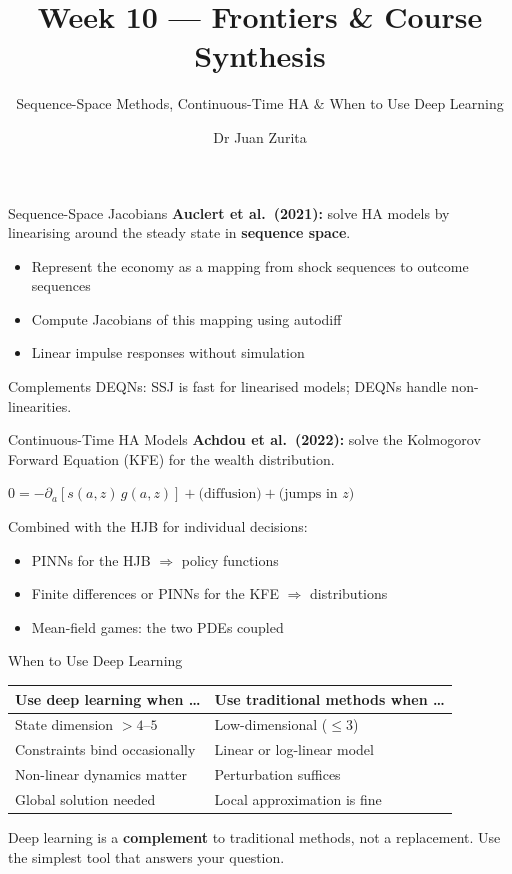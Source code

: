 \documentclass[aspectratio=169, 10pt]{beamer}
\title{Week 10 --- Frontiers \& Course Synthesis}
\subtitle{Sequence-Space Methods, Continuous-Time HA \& When to Use Deep Learning}
\author{Dr Juan Zurita}
\institute{Deep Learning for Macroeconomics\\
The University of Edinburgh~$\cdot$~School of Economics}
\date{}
\begin{document}
\maketitle

\begin{frame}{Sequence-Space Jacobians}
\textbf{Auclert et al.\ (2021):} solve HA models by linearising around the steady state in \textbf{sequence space}.

\bigskip
\begin{itemize}
\item Represent the economy as a mapping from shock sequences to outcome sequences
\item Compute Jacobians of this mapping using autodiff
\item Linear impulse responses without simulation
\end{itemize}

\bigskip
Complements DEQNs: SSJ is fast for linearised models; DEQNs handle non-linearities.
\end{frame}

\begin{frame}{Continuous-Time HA Models}
\textbf{Achdou et al.\ (2022):} solve the Kolmogorov Forward Equation (KFE) for the wealth distribution.

\bigskip
$0 = -\partial_a[s(a,z)\,g(a,z)] + \text{(diffusion)} + \text{(jumps in } z\text{)}$

\bigskip
Combined with the HJB for individual decisions:

\bigskip
\begin{itemize}
\item PINNs for the HJB $\Rightarrow$ policy functions
\item Finite differences or PINNs for the KFE $\Rightarrow$ distributions
\item Mean-field games: the two PDEs coupled
\end{itemize}
\end{frame}

\begin{frame}{When to Use Deep Learning}
\begin{center}
\begin{tabular}{ll}
\toprule
Use deep learning when \ldots & Use traditional methods when \ldots \\
\midrule
State dimension $> 4$--$5$ & Low-dimensional ($\leq 3$) \\
Constraints bind occasionally & Linear or log-linear model \\
Non-linear dynamics matter & Perturbation suffices \\
Global solution needed & Local approximation is fine \\
\bottomrule
\end{tabular}
\end{center}

\bigskip
Deep learning is a \textbf{complement} to traditional methods, not a replacement. Use the simplest tool that answers your question.
\end{frame}
\end{document}
